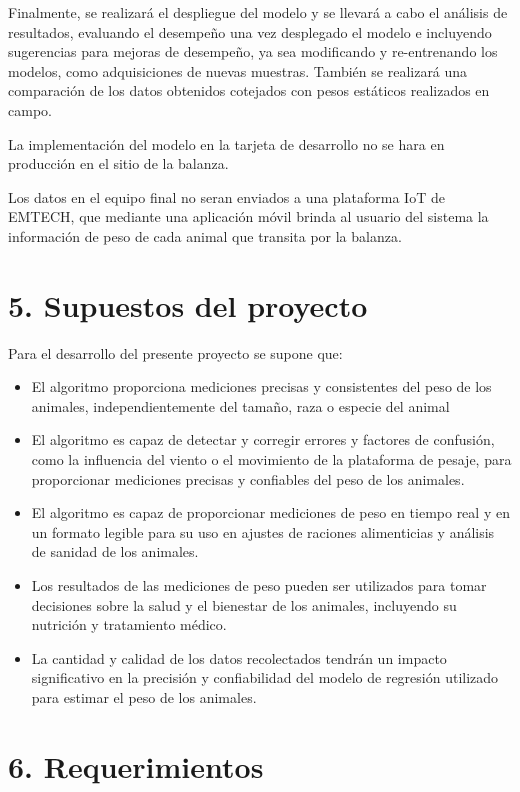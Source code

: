 \documentclass[
11pt, %
codirector, %
]{charter}
\begin{document}
Finalmente, se realizará el despliegue del modelo y se llevará a cabo el análisis de resultados, evaluando el desempeño una vez desplegado el modelo e incluyendo sugerencias para mejoras de desempeño, ya sea modificando y re-entrenando los modelos, como adquisiciones de nuevas muestras. También se realizará una comparación de los datos obtenidos cotejados con pesos estáticos realizados en campo.

La implementación del modelo en la tarjeta de desarrollo no se hara en producción en el sitio de la balanza.

Los datos en el equipo final no seran enviados a una plataforma IoT de EMTECH, que mediante una aplicación móvil brinda al usuario del sistema la información de peso de cada animal que transita por la balanza.

\section{5. Supuestos del proyecto}
\label{sec:supuestos}

Para el desarrollo del presente proyecto se supone que:

\begin{itemize}
	\item El algoritmo proporciona mediciones precisas y consistentes del peso de los animales, independientemente del tamaño, raza o especie del animal
	\item  El algoritmo es capaz de detectar y corregir errores y factores de confusión, como la influencia del viento o el movimiento de la plataforma de pesaje, para proporcionar mediciones precisas y confiables del peso de los animales.
	\item  El algoritmo es capaz de proporcionar mediciones de peso en tiempo real y en un formato legible para su uso en ajustes de raciones alimenticias y análisis de sanidad de los animales.
	\item Los resultados de las mediciones de peso pueden ser utilizados para tomar decisiones sobre la salud y el bienestar de los animales, incluyendo su nutrición y tratamiento médico.
	\item La cantidad y calidad de los datos recolectados tendrán un impacto significativo en la precisión y confiabilidad del modelo de regresión utilizado para estimar el peso de los animales.
\end{itemize}



\section{6. Requerimientos}
\label{sec:requerimientos}
\end{document}
